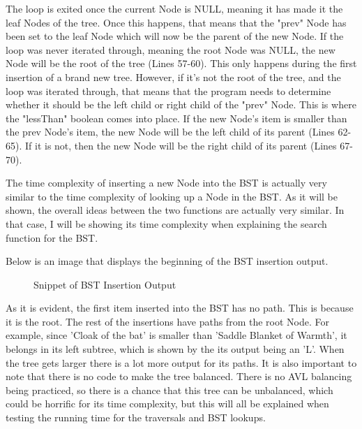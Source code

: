 \documentclass[letterpaper, 10pt]{article}
\begin{document}
\vspace{1em}
\noindent
The loop is exited once the current Node is NULL, meaning it has made it the leaf Nodes of the tree. Once this happens, that means that the "prev" Node has been set to the leaf Node which will now be the parent of the new Node. If the loop was never iterated through, meaning the root Node was NULL, the new Node will be the root of the tree (Lines 57-60). This only happens during the first insertion of a brand new tree. However, if it's not the root of the tree, and the loop was iterated through, that means that the program needs to determine whether it should be the left child or right child of the "prev" Node. This is where the "lessThan" boolean comes into place. If the new Node's item is smaller than the prev Node's item, the new Node will be the left child of its parent (Lines 62-65). If it is not, then the new Node will be the right child of its parent (Lines 67-70).

\vspace{1em}
\noindent
The time complexity of inserting a new Node into the BST is actually very similar to the time complexity of looking up a Node in the BST. As it will be shown, the overall ideas between the two functions are actually very similar. In that case, I will be showing its time complexity when explaining the search function for the BST.

\vspace{5em}
\noindent
Below is an image that displays the beginning of the BST insertion output.

\begin{figure}[H] 
    \centering 
    \caption{Snippet of BST Insertion Output}
    \label{fig:figure3.7}
\end{figure}

\noindent
As it is evident, the first item inserted into the BST has no path. This is because it is the root. The rest of the insertions have paths from the root Node. For example, since 'Cloak of the bat' is smaller than 'Saddle Blanket of Warmth', it belongs in its left subtree, which is shown by the its output being an 'L'. When the tree gets larger there is a lot more output for its paths. It is also important to note that there is no code to make the tree balanced. There is no AVL balancing being practiced, so there is a chance that this tree can be unbalanced, which could be horrific for its time complexity, but this will all be explained when testing the running time for the traversals and BST lookups. 
\end{document}
